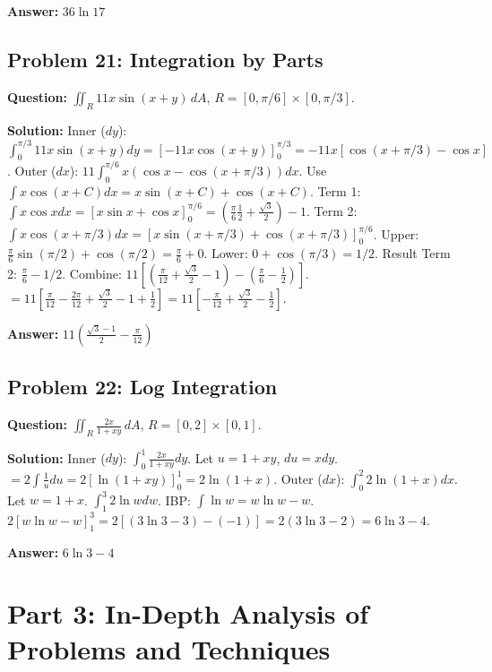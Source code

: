 \documentclass[11pt,a4paper]{article}
\begin{document}
\textbf{Answer:} $36 \ln 17$

\subsection*{Problem 21: Integration by Parts}
\textbf{Question:} $\iint_R 11x \sin(x+y) \, dA$, $R = [0, \pi/6] \times [0, \pi/3]$.

\textbf{Solution:}
Inner ($dy$):
$\int_0^{\pi/3} 11x \sin(x+y) dy = [-11x \cos(x+y)]_0^{\pi/3} = -11x [\cos(x+\pi/3) - \cos x]$.
Outer ($dx$):
$11 \int_0^{\pi/6} x (\cos x - \cos(x+\pi/3)) dx$.
Use $\int x \cos(x+C) dx = x \sin(x+C) + \cos(x+C)$.
Term 1: $\int x \cos x dx = [x \sin x + \cos x]_0^{\pi/6} = (\frac{\pi}{6}\frac{1}{2} + \frac{\sqrt{3}}{2}) - 1$.
Term 2: $\int x \cos(x+\pi/3) dx = [x \sin(x+\pi/3) + \cos(x+\pi/3)]_0^{\pi/6}$.
Upper: $\frac{\pi}{6} \sin(\pi/2) + \cos(\pi/2) = \frac{\pi}{6} + 0$.
Lower: $0 + \cos(\pi/3) = 1/2$.
Result Term 2: $\frac{\pi}{6} - 1/2$.
Combine: $11 [ (\frac{\pi}{12} + \frac{\sqrt{3}}{2} - 1) - (\frac{\pi}{6} - \frac{1}{2}) ]$.
$= 11 [ \frac{\pi}{12} - \frac{2\pi}{12} + \frac{\sqrt{3}}{2} - 1 + \frac{1}{2} ] = 11 [ -\frac{\pi}{12} + \frac{\sqrt{3}}{2} - \frac{1}{2} ]$.

\textbf{Answer:} $11(\frac{\sqrt{3}-1}{2} - \frac{\pi}{12})$

\subsection*{Problem 22: Log Integration}
\textbf{Question:} $\iint_R \frac{2x}{1+xy} \, dA$, $R = [0,2] \times [0,1]$.

\textbf{Solution:}
Inner ($dy$): $\int_0^1 \frac{2x}{1+xy} dy$. Let $u=1+xy$, $du=x dy$.
$= 2 \int \frac{1}{u} du = 2 [\ln(1+xy)]_0^1 = 2 \ln(1+x)$.
Outer ($dx$): $\int_0^2 2 \ln(1+x) dx$.
Let $w=1+x$. $\int_1^3 2 \ln w dw$.
IBP: $\int \ln w = w \ln w - w$.
$2 [ w \ln w - w ]_1^3 = 2 [ (3 \ln 3 - 3) - (-1) ] = 2 (3 \ln 3 - 2) = 6 \ln 3 - 4$.

\textbf{Answer:} $6 \ln 3 - 4$

\newpage
\section{Part 3: In-Depth Analysis of Problems and Techniques}
\end{document}
